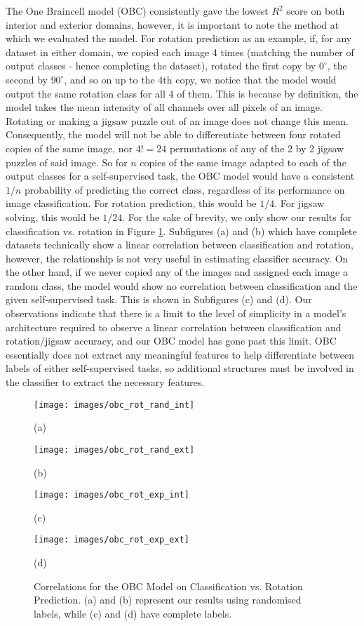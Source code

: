 \documentclass{article}
\begin{document}
The One Braincell model (OBC) consistently gave the lowest $R^2$ score on both interior and exterior domains, however, it is important to note the method at which we evaluated the model. For rotation prediction as an example, if, for any dataset in either domain, we copied each image 4 times (matching the number of output classes - hence completing the dataset), rotated the first copy by $0^\circ$, the second by $90^\circ$, and so on up to the 4th copy, we notice that the model would output the same rotation class for all 4 of them. This is because by definition, the model takes the mean intensity of all channels over all pixels of an image. Rotating or making a jigsaw puzzle out of an image does not change this mean. Consequently, the model will not be able to differentiate between four rotated copies of the same image, nor $4! = 24$ permutations of any of the 2 by 2 jigsaw puzzles of said image. So for $n$ copies of the same image adapted to each of the output classes for a self-supervised task, the OBC model would have a consistent $1/n$ probability of predicting the correct class, regardless of its performance on image classification. For rotation prediction, this would be $1/4$. For jigsaw solving, this would be $1/24$. For the sake of brevity, we only show our results for classification vs. rotation in Figure \ref{fig:obc}. Subfigures (a) and (b) which have complete datasets technically show a linear correlation between classification and rotation, however, the relationship is not very useful in estimating classifier accuracy. On the other hand, if we never copied any of the images and assigned each image a random class, the model would show no correlation between classification and the given self-supervised task. This is shown in Subfigures (c) and (d). Our observations indicate that there is a limit to the level of simplicity in a model's architecture required to observe a linear correlation between classification and rotation/jigsaw accuracy, and our OBC model has gone past this limit. OBC essentially does not extract any meaningful features to help differentiate between labels of either self-supervised tasks, so additional structures must be involved in the classifier to extract the necessary features. 
\begin{figure}[!t]
    \texttt{[image: images/obc\_rot\_rand\_int]}
    \caption*{(a)}
  \endminipage\hfill
    \texttt{[image: images/obc\_rot\_rand\_ext]}
    \caption*{(b)}
  \endminipage
  \vfill
    \texttt{[image: images/obc\_rot\_exp\_int]}
    \caption*{(c)}
  \endminipage\hfill
    \texttt{[image: images/obc\_rot\_exp\_ext]}
    \caption*{(d)}
  \endminipage
  \caption{Correlations for the OBC Model on Classification vs. Rotation Prediction. (a) and (b) represent our results using randomised labels, while (c) and (d) have complete labels.}\label{fig:obc}
\end{figure}
\end{document}

